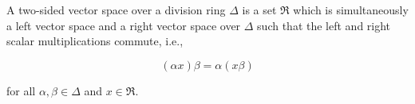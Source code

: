 A two-sided vector space over a division ring $\Delta$ is a set $\mathfrak{R}$ which is simultaneously a left vector space and a right vector space over $\Delta$ such that the left and right scalar multiplications commute, i.e.,

$$(\alpha x)\beta = \alpha(x\beta)$$

for all $\alpha, \beta \in \Delta$ and $x \in \mathfrak{R}$.
